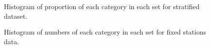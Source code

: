 \documentclass[12pt]{article}\usepackage[]{graphicx}\usepackage[]{color}
\begin{document}
\begin{appendices}
\begin{figure}[htb]
{}

\caption{Histogram of proportion of each category in each set for stratified dataset.}\label{fig:prop-strat}
\end{figure}
\begin{figure}[htb]

{\centering {} 

}

\caption{Histogram of numbers of each category in each set for fixed stations data.}\label{fig:num-fix}
\end{figure}
\begin{figure}[htb]

{\centering {} 

}
\end{figure}
\end{appendices}
\end{document}
